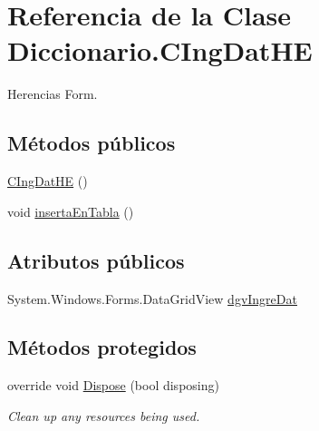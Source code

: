 \hypertarget{class_diccionario_1_1_c_ing_dat_h_e}{\section{Referencia de la Clase Diccionario.\-C\-Ing\-Dat\-H\-E}
\label{class_diccionario_1_1_c_ing_dat_h_e}
}


Herencias Form.

\subsection*{Métodos públicos}
\begin{DoxyCompactItemize}
\item 
\hyperlink{class_diccionario_1_1_c_ing_dat_h_e_afcab610203db5cc0a49423c3578f2800}{C\-Ing\-Dat\-H\-E} ()
\item 
void \hyperlink{class_diccionario_1_1_c_ing_dat_h_e_af7613f69a5224c5f5f321d1ed3822055}{inserta\-En\-Tabla} ()
\end{DoxyCompactItemize}
\subsection*{Atributos públicos}
\begin{DoxyCompactItemize}
\item 
System.\-Windows.\-Forms.\-Data\-Grid\-View \hyperlink{class_diccionario_1_1_c_ing_dat_h_e_ae337a707bab85677e926c90f395fcfa2}{dgv\-Ingre\-Dat}
\end{DoxyCompactItemize}
\subsection*{Métodos protegidos}
\begin{DoxyCompactItemize}
\item 
override void \hyperlink{class_diccionario_1_1_c_ing_dat_h_e_a27d3cb6b775ddf9609c303180503b3a0}{Dispose} (bool disposing)
\begin{DoxyCompactList}\small\item\em Clean up any resources being used. \end{DoxyCompactList}\end{DoxyCompactItemize}
